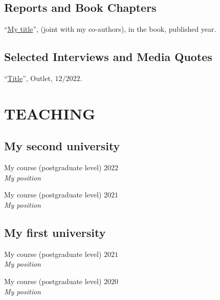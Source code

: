 \documentclass[11pt,]{article}
\providecommand{\tightlist}{%
  \setlength{\itemsep}{0pt}\setlength{\parskip}{0pt}}
\renewenvironment{itemize}{
  \begin{list}{}{
    \setlength{\leftmargin}{1.5em}
  }
}{
  \end{list}
}
\begin{document}
\subsection{Reports and Book Chapters}\label{reports-and-book-chapters}

\begin{itemize}
\tightlist
\item
  ``\href{my\%20URL}{My title}'', (joint with my co-authors), in the
  book, published year.
\end{itemize}

\subsection{Selected Interviews and Media
Quotes}\label{selected-interviews-and-media-quotes}

\begin{itemize}
\tightlist
\item
  ``\href{URL}{Title}'', Outlet, \(12/2022\).
\end{itemize}

\section{TEACHING}\label{teaching}

\subsection{\texorpdfstring{\textbf{My second
university}}{My second university}}\label{my-second-university}

\begin{itemize}
\item
  My course (postgraduate level) \hfill \(2022\)\\
  \emph{My position}
\item
  My course (postgraduate level) \hfill \(2021\)\\
  \emph{My position}
\end{itemize}

\subsection{\texorpdfstring{\textbf{My first
university}}{My first university}}\label{my-first-university}

\begin{itemize}
\item
  My course (postgraduate level) \hfill \(2021\)\\
  \emph{My position}
\item
  My course (postgraduate level) \hfill \(2020\)\\
  \emph{My position}
\end{itemize}
\end{document}
